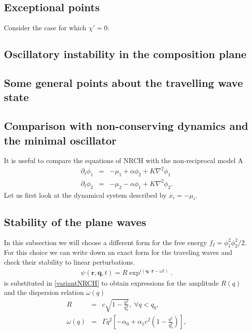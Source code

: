 \subsection{Exceptional points}
Consider the case for which $\chi' = 0$.  

\subsection{Oscillatory instability in the composition plane}

\subsection{Some general points about the travelling wave state}

\subsection{Comparison with non-conserving dynamics and the minimal oscillator}
It is useful to compare the equations of NRCH with the non-reciprocal model A 
\begin{eqnarray}
    \partial_t \phi_1 &=& - \mu_1 + \alpha \phi_2 + K \nabla^2 \phi_1\\
    \partial_t \phi_2 &=& - \mu_2 - \alpha \phi_1 + K \nabla^2 \phi_2.
    \label{eq:NonReciprocalModelA}
\end{eqnarray}
Let us first look at the dynamical system described by $\dot{x_i} = - \mu_i$. 




\subsection{Stability of the plane waves}
In this subsection we will choose a different form for the free energy $f_I = \phi_1^2 \phi_2^2 /2 $. For this choice we can write down an exact form for the traveling waves and check their stability to linear perturbations. 
\begin{eqnarray}
\psi(\bm{r}, \bm{q},t) = R \exp^{i( \bm{q} \cdot \bm{r} - \omega t)}.
\label{eq:planeWave}
\end{eqnarray}
is substituted in \eqref{variantNRCH} to obtain expressions for the amplitude $R(q)$ and the dispersion relation $\omega(q)$
\begin{eqnarray}
R &=& c \sqrt{1-\frac{q^2}{q_0^2}}, \; \forall q < q_0, \nonumber \\
\omega(q) &=& {\Gamma} q^2 \left[- \alpha_0 + \alpha_1 c^2\left( 1- \frac{q^2}{q_0^2} \right) \right], 
\label{eq:dispersion}
\end{eqnarray}

